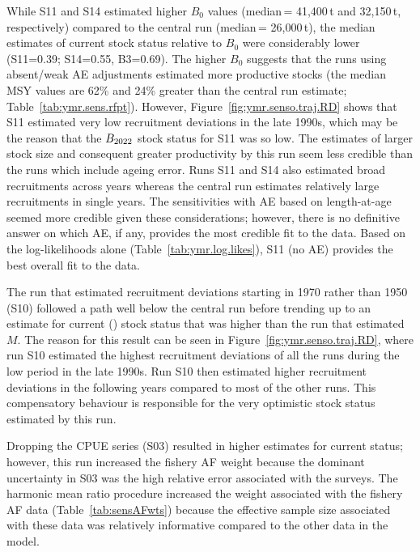 \documentclass[11pt]{book}
\newcommand{\pc}{\%}
\begin{document}
While S11 and S14 estimated higher $B_0$ values (median\,= 41,400\,t and 32,150\,t, respectively) compared to the central run (median\,= 26,000\,t), the median estimates of current stock status relative to $B_0$ were considerably lower (S11=0.39; S14=0.55, B3=0.69).
The higher $B_0$ suggests that the runs using absent/weak AE adjustments estimated more productive stocks (the median MSY values are 62\pc{} and 24\pc{} greater than the central run estimate; Table~\ref{tab:ymr.sens.rfpt}).
However, Figure~\ref{fig:ymr.senso.traj.RD} shows that S11 estimated very low recruitment deviations in the late 1990s, which may be the reason that the $B_{2022}$ stock status for S11 was so low.
The estimates of larger stock size and consequent greater productivity by this run seem less credible than the runs which include ageing error.
Runs S11 and S14 also estimated broad recruitments across years whereas the central run estimates relatively large recruitments in single years.
The sensitivities with AE based on length-at-age seemed more credible given these considerations; however, there is no definitive answer on which AE, if any, provides the most credible fit to the data.
Based on the log-likelihoods alone (Table~\ref{tab:ymr.log.likes}), S11 (no AE) provides the best overall fit to the data.

The run that estimated recruitment deviations starting in 1970 rather than 1950 (S10) followed a path well below the central run before trending up to an estimate for current (\currYear) stock status that was higher than the run that estimated $M$.
The reason for this result can be seen in Figure~\ref{fig:ymr.senso.traj.RD}, where run S10 estimated the highest recruitment deviations of all the runs during the low period in the late 1990s.
Run S10 then estimated higher recruitment deviations in the following years compared to most of the other runs.
This compensatory behaviour is responsible for the very optimistic stock status estimated by this run.

Dropping the CPUE series (S03) resulted in higher estimates for current status; however, this run increased the fishery AF weight because the dominant uncertainty in S03 was the high relative error associated with the surveys.
The harmonic mean ratio procedure increased the weight associated with the fishery AF data (Table~\ref{tab:sensAFwts}) because the effective sample size associated with these data was relatively informative compared to the other data in the model.
\end{document}
